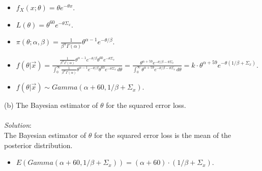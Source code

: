 \documentclass[12pt]{article}
\newcommand{\ds}{\displaystyle}
\begin{document}
\begin{itemize}
    \item $ \ds f_X(x ; \theta) = \theta e^{-\theta x} $. \\
    \item $ \ds L(\theta) = \theta^{60} e^{-\theta\Sigma_{x}} $. \\
    \item $ \ds \pi(\theta ; \alpha, \beta) = \frac{ 1 }{ \beta^{\alpha} \Gamma(\alpha) } \theta^{\alpha - 1} e^{-\theta / \beta} $. \\
    \item $ \ds f(\theta | \overrightarrow{x}) = \frac{ \ds \frac{ 1 }{ \beta^{\alpha} \Gamma(\alpha) } \theta^{\alpha - 1} e^{-\theta / \beta} \theta^{60} e^{-\theta\Sigma_{x}} }{ \ds \int_{0}^{\infty} \frac{ 1 }{ \beta^{\alpha} \Gamma(\alpha) } \theta^{\alpha - 1} e^{-\theta / \beta} \theta^{60} e^{-\theta\Sigma_{x}} \, d\theta } =
    \frac{ \ds \theta^{\alpha + 59} e^{-\theta / \beta - \theta\Sigma_{x}} }{ \ds \int_{0}^{\infty} \theta^{\alpha + 59} e^{-\theta / \beta - \theta\Sigma_{x}} \, d\theta } = k \cdot \theta^{\alpha + 59} e^{-\theta( 1 / \beta + \Sigma_{x})} $. \\
    \item $ \ds f(\theta | \overrightarrow{x}) \sim Gamma(\alpha + 60, 1 / \beta + \Sigma_{x}) $. \\
\end{itemize}

\newpage

\vspace{2.5mm}

(b) The Bayesian estimator of $ \theta $ for the squared error loss. \\
\vspace{2.5mm} \\
\textit{Solution}:
\vspace{2.5mm} \\

\noindent
The Bayesian estimator of $ \theta $ for the squared error loss is the mean of the posterior distribution. \\

\begin{itemize}
    \item $ \ds E(Gamma(\alpha + 60, 1 / \beta + \Sigma_{x})) = (\alpha + 60) \cdot (1 / \beta + \Sigma_{x}) $.
\end{itemize}
\end{document}
